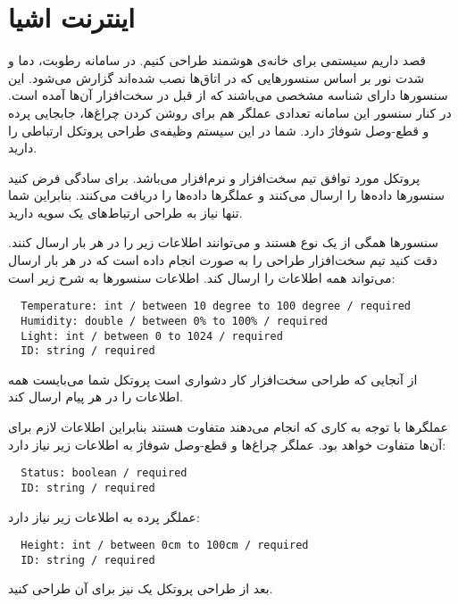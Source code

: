 \documentclass[../main.tex]{subfiles}
\begin{document}
\section{اینترنت اشیا}

قصد داریم سیستمی برای خانه‌ی هوشمند طراحی کنیم.
در سامانه رطوبت، دما و شدت نور بر اساس سنسورهایی که در اتاق‌ها نصب شده‌اند گزارش می‌شود.
این سنسورها دارای شناسه مشخصی می‌باشند که از قبل در سخت‌افزار آن‌ها آمده است.
در کنار سنسور این سامانه تعدادی عملگر هم برای روشن کردن چراغ‌ها، جابجایی پرده و قطع-وصل شوفاژ دارد.
شما در این سیستم وظیفه‌ی طراحی پروتکل ارتباطی را دارید.

پروتکل مورد توافق تیم سخت‌افزار و نرم‌افزار  می‌باشد. برای سادگی فرض کنید سنسورها داده‌ها را ارسال می‌کنند و عملگرها داده‌ها را دریافت می‌کنند.
بنابراین شما تنها نیاز به طراحی ارتباط‌های یک سویه دارید.

سنسورها همگی از یک نوع هستند و می‌توانند اطلاعات زیر را در هر بار ارسال کنند.
دقت کنید تیم سخت‌افزار طراحی را به صورت انجام داده است که در هر بار ارسال می‌تواند همه اطلاعات را ارسال کند.
اطلاعات سنسورها به شرح زیر است:

\begin{latin}
\begin{lstlisting}
  Temperature: int / between 10 degree to 100 degree / required
  Humidity: double / between 0% to 100% / required
  Light: int / between 0 to 1024 / required
  ID: string / required
\end{lstlisting}
\end{latin}

از آنجایی که طراحی سخت‌افزار کار دشواری است پروتکل شما می‌بایست همه اطلاعات را در هر پیام ارسال کند.

عملگرها با توجه به کاری که انجام می‌دهند متفاوت هستند بنابراین اطلاعات لازم برای آن‌ها متفاوت خواهد بود.
عملگر چراغ‌ها و قطع-وصل شوفاژ به اطلاعات زیر نیاز دارد:

\begin{latin}
\begin{lstlisting}
  Status: boolean / required
  ID: string / required
\end{lstlisting}
\end{latin}

عملگر پرده به اطلاعات زیر نیاز دارد:

\begin{latin}
\begin{lstlisting}
  Height: int / between 0cm to 100cm / required
  ID: string / required
\end{lstlisting}
\end{latin}

بعد از طراحی پروتکل یک  نیز برای آن طراحی کنید.
\end{document}
